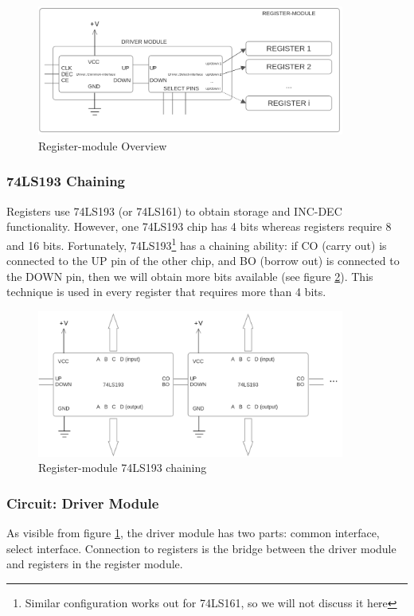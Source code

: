 \begin{figure}[H]
	\centering
	\includegraphics[width=0.9\textwidth]{img/register_module_overview}
	\caption{Register-module Overview}
	\label{fig:registerModuleOverview}
\end{figure}

\subsubsection{74LS193 Chaining}
Registers use 74LS193 (or 74LS161) to obtain storage and INC-DEC functionality. However, one 74LS193 chip has 4 bits whereas registers require 8 and 16 bits. Fortunately, 74LS193\footnote{Similar configuration works out for 74LS161, so we will not discuss it here} has a chaining ability: if CO (carry out) is connected to the UP pin of the other chip, and BO (borrow out) is connected to the DOWN pin, then we will obtain more bits available (see figure \ref{fig:registerModuleChaining}). This technique is used in every register that requires more than 4 bits.

\begin{figure}[H]
	\centering
	\includegraphics[width=0.9\textwidth]{img/register_module_chaining}
	\caption{Register-module 74LS193 chaining}
	\label{fig:registerModuleChaining}
\end{figure}

\subsubsection{Circuit: Driver Module}
As visible from figure \ref{fig:registerModuleOverview}, the driver module has two parts: common interface, select interface. Connection to registers is the bridge between the driver module and registers in the register module.

